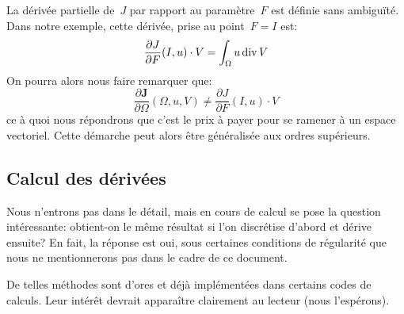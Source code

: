La dérivée partielle de~$J$ par rapport au paramètre~$F$ est définie sans ambiguïté. Dans notre exemple, cette dérivée, prise au point~$F=I$ est:
\begin{equation}
\dfrac{\partial J}{\partial F}(I,u)\cdot V = \displaystyle\int_\Omega u \operatorname{div} V
\end{equation}
On pourra alors nous faire remarquer que:
\begin{equation}
\dfrac{\partial{\mathbf J}}{\partial\Omega}(\Omega, u,V)
\ne
\dfrac{\partial J}{\partial F}(I,u)\cdot V
\end{equation}
ce à quoi nous répondrons que c'est le prix à payer pour se ramener à un espace vectoriel. Cette démarche peut alors être généralisée aux ordres supérieurs.

\medskip
\subsection{Calcul des dérivées}

Nous n'entrons pas dans le détail, mais en cours de calcul se pose la question intéressante: obtient-on le même résultat si l'on discrétise d'abord et dérive ensuite? En fait, la réponse est oui, sous certaines conditions de régularité que nous ne mentionnerons pas dans le cadre de ce document.

\medskip
{}

De telles méthodes sont d'ores et déjà implémentées dans certains codes de calculs. Leur intérêt devrait apparaître clairement au lecteur (nous l'espérons).
